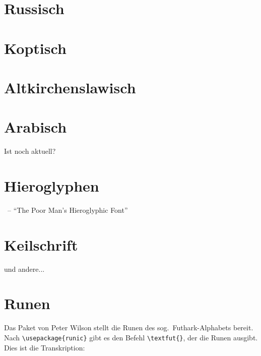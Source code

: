 \section{Russisch}

\section{Koptisch}

\section{Altkirchenslawisch}



\section{Arabisch}

Ist  noch aktuell?

\section{Hieroglyphen}

~-- \enquote{The Poor Man’s Hieroglyphic Font}




\section{Keilschrift}

 und andere...

\section{Runen}

Das Paket  von Peter Wilson stellt die Runen des sog.\ Futhark-Alphabets bereit.
Nach \lstinline/\usepackage{runic}/ gibt es den Befehl \lstinline/\textfut{}/, der
die Runen ausgibt. Dies ist die Transkription:

